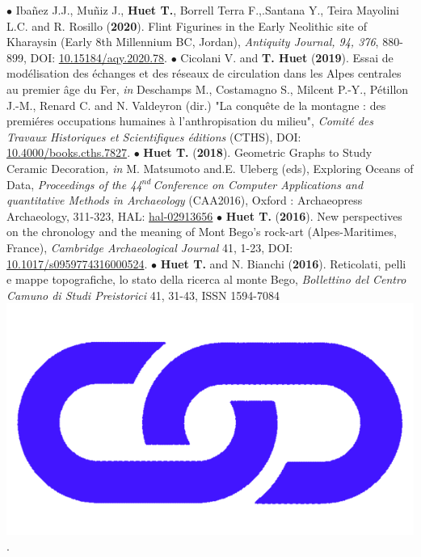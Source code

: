 \documentclass{article}
\begin{document}
\smallbreak
$\bullet$ Iba\~{n}ez J.J., Mu\~{n}iz J., \textbf{Huet T.}, Borrell Terra F.,.Santana Y., Teira Mayolini L.C. and R. Rosillo (\textbf{2020}). Flint Figurines in the Early Neolithic site of Kharaysin (Early 8th Millennium BC, Jordan), \textit{Antiquity Journal, 94, 376}, 880-899, DOI: \href{https://doi.org/10.15184/aqy.2020.78}{10.15184/aqy.2020.78}.
\smallbreak
$\bullet$ Cicolani V. and \textbf{T. Huet} (\textbf{2019}). Essai de mod\'{e}lisation des \'{e}changes et des r\'{e}seaux de circulation dans les Alpes centrales au premier \^{a}ge du Fer, \textit{in} Deschamps M., Costamagno S., Milcent P.-Y., Pétillon J.-M., Renard C. and N. Valdeyron (dir.) "La conqu\^{e}te de la montagne : des premi\'{e}res occupations humaines \`{a} l'anthropisation du milieu", \textit{Comit\'{e} des Travaux Historiques et Scientifiques \'{e}ditions} (CTHS), DOI: \href{https://books.openedition.org/cths/7827}{10.4000/books.cths.7827}.
\smallbreak
$\bullet$ \textbf{Huet T.} (\textbf{2018}). Geometric Graphs to Study Ceramic Decoration\textit{, in} M. Matsumoto and.E. Uleberg (eds), Exploring Oceans of Data, \textit{Proceedings of the 44${}^{nd\ }$Conference on Computer Applications and quantitative Methods in Archaeology} (CAA2016), Oxford : Archaeopress Archaeology, 311-323, HAL: \href{https://hal.archives-ouvertes.fr/hal-02913656}{hal-02913656}
\smallbreak
$\bullet$ \textbf{Huet T.} (\textbf{2016}). New perspectives on the chronology and the meaning of Mont Bego's rock-art (Alpes-Maritimes, France), \textit{Cambridge Archaeological Journal} 41, 1-23, DOI: \href{https://doi.org/10.1017/s0959774316000524}{10.1017/s0959774316000524}.
\smallbreak
$\bullet$ \textbf{Huet T.} and N. Bianchi (\textbf{2016}). Reticolati, pelli e mappe topografiche, lo stato della ricerca al monte Bego, \textit{Bollettino del Centro Camuno di Studi Preistorici} 41, 31-43, ISSN 1594-7084 \href{http://www.ccsp.it/web/infoccsp/bcsp/bcsp41_preview.pdf}{\includegraphics[scale=0.02]{link_darkblue.png}}.
\end{document}
